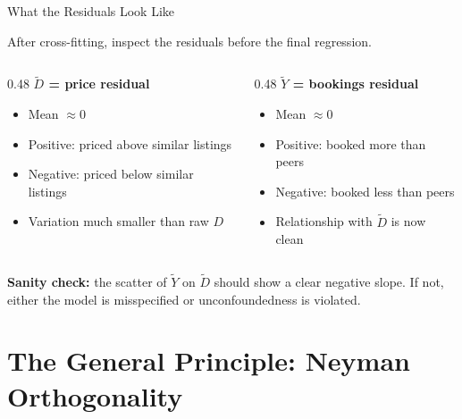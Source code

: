 \documentclass[aspectratio=169, 11pt, handout]{beamer}
\begin{document}
\begin{frame}{What the Residuals Look Like}

After cross-fitting, inspect the residuals before the final regression.

\bigskip

\begin{columns}[T]
\begin{column}{0.48\textwidth}
\textbf{$\tilde{D}$ = price residual}
\begin{itemize}
    \item Mean $\approx 0$
    \item Positive: priced above similar listings
    \item Negative: priced below similar listings
    \item Variation much smaller than raw $D$
\end{itemize}
\end{column}
\begin{column}{0.48\textwidth}
\textbf{$\tilde{Y}$ = bookings residual}
\begin{itemize}
    \item Mean $\approx 0$
    \item Positive: booked more than peers
    \item Negative: booked less than peers
    \item Relationship with $\tilde{D}$ is now clean
\end{itemize}
\end{column}
\end{columns}

\bigskip
\pause

\textbf{Sanity check:} the scatter of $\tilde{Y}$ on $\tilde{D}$ should show a clear negative slope. If not, either the model is misspecified or unconfoundedness is violated.

\end{frame}




\section{The General Principle: Neyman Orthogonality}
\end{document}
